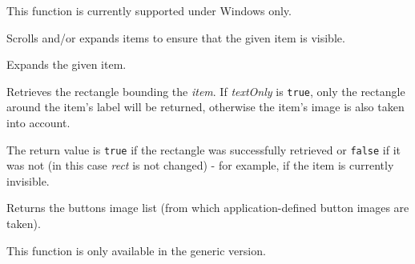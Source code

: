 This function is currently supported under Windows only.




\label{wxtreectrlensurevisible}


Scrolls and/or expands items to ensure that the given item is visible.


\label{wxtreectrlexpand}


Expands the given item.


\label{wxtreectrlgetitemrect}


Retrieves the rectangle bounding the {\it item}. If {\it textOnly} is {\tt true},
only the rectangle around the item's label will be returned, otherwise the
item's image is also taken into account.

The return value is {\tt true} if the rectangle was successfully retrieved or {\tt false}
if it was not (in this case {\it rect} is not changed) - for example, if the
item is currently invisible.




\label{wxtreectrlgetbuttonsimagelist}


Returns the buttons image list (from which application-defined button images are taken).

This function is only available in the generic version.


\label{wxtreectrlgetchildrencount}


